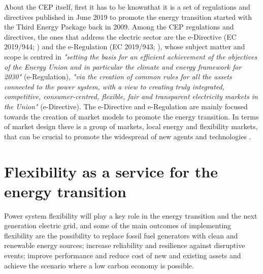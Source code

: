 About the CEP itself, first it has to be knownthat it is a set of regulations and directives published in June 2019 to promote the energy transition started with the Third Energy Package back in 2009. Among the CEP regulations and directives, the ones that address the electric sector are the e-Directive (EC 2019/944; \cite{Directive2019944}) and the e-Regulation (EC 2019/943; \cite{Directive2019943}), whose subject matter and scope is centred in \textit{"setting the basis for an efficient achievement of the objectives of the Energy Union and in particular the climate and energy framework for 2030"} (e-Regulation), \textit{"via the creation of common rules for all the assets connected to the power system, with a view to creating truly integrated, competitive, consumer-centred, flexible, fair and transparent electricity markets in the Union"} (e-Directive). The e-Directive and e-Regulation are mainly focused towards the creation of market models to
promote the energy transition. In terms of market design there is a group of markets, local energy and flexibility markets, that can be crucial to promote the widespread of new agents and technologies \cite{Xu2019}.


\section{Flexibility as a service for the energy transition}
Power system flexibility will play a key role in the energy transition and the next generation electric grid, and some of the main outcomes of implementing flexibility are the possibility to replace fossil fuel generators with clean and renewable energy sources; increase reliability and resilience against disruptive events; improve performance and reduce cost of new and existing assets and achieve the scenario where a low carbon economy is possible. 

